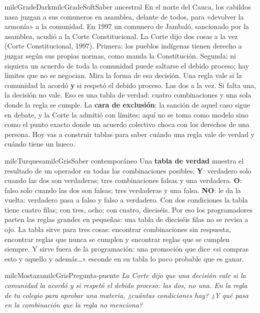 \documentclass[11pt,letterpaper]{article}
\begin{document}
\begin{softbox}{milcGradeDark}{milcGradeSoft}{Saber ancestral}
En el norte del Cauca, los cabildos nasa juzgan a sus comuneros en asamblea, delante de todos, para «devolver la armonía» a la comunidad. En 1997 un comunero de Jambaló, sancionado por la asamblea, acudió a la Corte Constitucional. La Corte dijo dos cosas a la vez (Corte Constitucional, 1997). Primera: los pueblos indígenas tienen derecho a juzgar según sus propias normas, como manda la Constitución. Segunda: ni siquiera un acuerdo de toda la comunidad puede saltarse el debido proceso; hay límites que no se negocian. Mira la forma de esa decisión. Una regla vale si la comunidad la acordó \textbf{y} si respetó el debido proceso. Las dos a la vez. Si falta una, la decisión no vale. Eso es una tabla de verdad: cuatro combinaciones y una sola donde la regla se cumple. La \textbf{cara de exclusión}: la sanción de aquel caso sigue en debate, y la Corte la admitió con límites; aquí no se toma como modelo sino como el punto exacto donde un acuerdo colectivo choca con los derechos de una persona. Hoy vas a construir tablas para saber cuándo una regla vale de verdad y cuándo tiene un hueco.\par{}
\end{softbox}

\begin{softbox}{milcTurquesa}{milcGris}{Saber contemporáneo}
Una \textbf{tabla de verdad} muestra el resultado de un operador en todas las combinaciones posibles. \textbf{Y}: verdadero solo cuando las dos son verdaderas; tres combinaciones falsas y una verdadera. \textbf{O}: falso solo cuando las dos son falsas; tres verdaderas y una falsa. \textbf{NO}: le da la vuelta: verdadero pasa a falso y falso a verdadero. Con dos condiciones la tabla tiene cuatro filas; con tres, ocho; con cuatro, dieciséis. Por eso los programadores parten las reglas grandes en pequeñas: una tabla de dieciséis filas no se revisa a ojo. La tabla sirve para tres cosas: encontrar combinaciones sin respuesta, encontrar reglas que nunca se cumplen y encontrar reglas que se cumplen siempre. Y sirve fuera de la programación: una promoción que dice «si compras esto y aquello y además…» esconde en su tabla lo poco probable que es ganar.
\end{softbox}

\begin{softbox}{milcMostaza}{milcGris}{Pregunta-puente}
\textit{La Corte dijo que una decisión vale si la comunidad la acordó y si respetó el debido proceso: las dos, no una. En la regla de tu colegio para aprobar una materia, ¿cuántas condiciones hay? ¿Y qué pasa en la combinación que la regla no menciona?}
\end{softbox}
\end{document}

